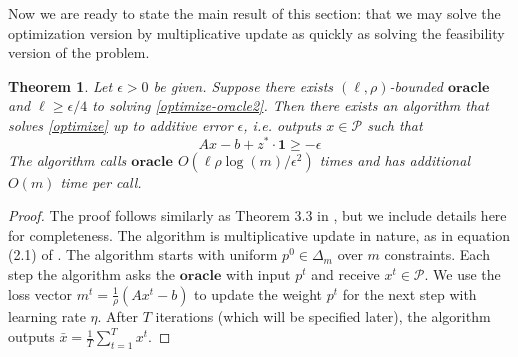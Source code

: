 \documentclass{article}
\newtheorem{theorem}{Theorem}[section]
\newcommand{\cP}{\mathcal{P}}
\newcommand{\onevec}{\mathbf{1}}
\newcommand{\oracle}{\mathbf{oracle}}
\begin{document}
Now we are ready to state the main result of this section: that we may solve the optimization version by multiplicative update as quickly as solving the feasibility version of the problem.
\begin{theorem} \label{thm:mw-main}
Let \(\epsilon>0\) be given. Suppose there exists \((\ell,\rho)\)-bounded \(\oracle\) and \(\ell\geq\epsilon/4\) to solving \eqref{optimize-oracle2}. Then there exists an algorithm that solves \eqref{optimize} up to additive error \(\epsilon\), i.e. outputs \(x\in \cP\) such that \begin{equation}
Ax-b+z^* \cdot \onevec \geq-\epsilon
\end{equation}
The algorithm calls \(\oracle\) \(O(\ell\rho\log(m)/\epsilon^2)\) times and has additional \(O(m)\) time per call.
\end{theorem}
\begin{proof}
The proof follows similarly as Theorem 3.3 in \citet{arora2012multiplicative}, but we include details here for completeness. The algorithm is multiplicative update in nature, as in equation (2.1) of \citet{arora2012multiplicative}. The algorithm starts with uniform \(p^0\in\Delta_m\) over \(m\) constraints. Each step the algorithm asks the \(\oracle\) with input \(p^t\) and receive \(x^t\in\cP\). We use the loss vector \(m^t=\frac{1}{\rho}(Ax^t-b)\) to update the weight \(p^t\) for the next step with learning rate \(\eta\). After \(T\) iterations (which will be specified later), the algorithm outputs \(\bar{x}=\frac{1}{T}\sum_{t=1}^T x^t\).


\end{proof}
\end{document}
